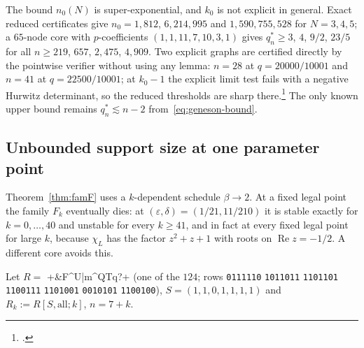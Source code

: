\documentclass[11pt]{article}
\theoremstyle{definition}
\newcommand{\eps}{\varepsilon}
\newcommand{\Rea}{\operatorname{Re}}
\begin{document}
The bound $n_0(N)$ is super-exponential, and $k_0$ is not explicit in general. Exact reduced certificates give $n_0=1{,}812$,
$6{,}214{,}995$ and $1{,}590{,}755{,}528$ for $N=3,4,5$; a $65$-node core with $p$-coefficients $(1,1,11,7,10,3,1)$ gives
$q_n^*\ge3$, $4$, $9/2$, $23/5$ for all $n\ge219$, $657$, $2{,}475$, $4{,}909$. Two explicit graphs are certified directly by the
pointwise verifier without using any lemma: $n=28$ at $q=20000/10001$ and $n=41$ at $q=22500/10001$; at $k_0-1$ the explicit limit
test fails with a negative Hurwitz determinant, so the reduced thresholds are sharp there.\footnote{.}
The only known upper bound remains $q_n^*\lesssim n-2$ from~\eqref{eq:geneson-bound}.

\subsection{Unbounded support size at one parameter point}
Theorem~\ref{thm:famF} uses a $k$-dependent schedule $\beta\to2$. At a fixed legal point the family $F_k$ eventually dies: at
$(\eps,\delta)=(1/21,11/210)$ it is stable exactly for $k=0,\dots,40$ and unstable for every $k\ge41$, and in fact at every fixed
legal point for large $k$, because $\chi_L$ has the factor $z^2+z+1$ with roots on $\Rea z=-1/2$. A different core avoids this.

Let $R=$ \dsix+&F^U|m^QTq?+ (one of the $124$; rows \texttt{0111110} \texttt{1011011} \texttt{1101101} \texttt{1100111} \texttt{1101001}
\texttt{0010101} \texttt{1100100}),
$S=(1,1,0,1,1,1,1)$ and $R_k:=R[S,\text{all};k]$, $n=7+k$.
\end{document}
